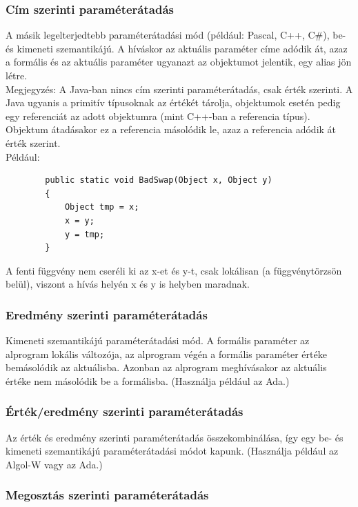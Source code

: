 \documentclass[margin=0px]{article}
\begin{document}
\subsubsection{Cím szerinti paraméterátadás}

A másik legelterjedtebb paraméterátadási mód (például: Pascal, C++, C\#), be- és kimeneti szemantikájú. A híváskor az aktuális paraméter címe adódik át, azaz a formális és az aktuális paraméter ugyanazt az objektumot jelentik, egy alias jön létre.\\

Megjegyzés: A Java-ban nincs cím szerinti paraméterátadás, csak érték szerinti. A Java ugyanis a primitív típusoknak az értékét tárolja,
objektumok esetén pedig egy referenciát az adott objektumra (mint C++-ban a referencia típus).  Objektum átadásakor ez a referencia másolódik le, azaz a referencia adódik át érték szerint.\\

\noindent	Például:
\begin{verbatim}
        public static void BadSwap(Object x, Object y)
        {
            Object tmp = x;
            x = y;
            y = tmp;
        }
\end{verbatim}

A fenti függvény nem cseréli ki az x-et és y-t, csak lokálisan (a függvénytörzsön belül), viszont a hívás helyén
x és y is helyben maradnak.

\subsubsection{Eredmény szerinti paraméterátadás}

Kimeneti szemantikájú paraméterátadási mód. A formális paraméter az alprogram lokális változója, az alprogram végén a formális paraméter értéke bemásolódik az aktuálisba. Azonban az alprogram meghívásakor az aktuális értéke nem másolódik be a formálisba. (Használja például az Ada.)

\subsubsection{Érték/eredmény szerinti paraméterátadás}

Az érték és eredmény szerinti paraméterátadás összekombinálása, így egy be- és kimeneti szemantikájú paraméterátadási módot kapunk. (Használja például az Algol-W vagy az Ada.)

\subsubsection{Megosztás szerinti paraméterátadás}
\end{document}
